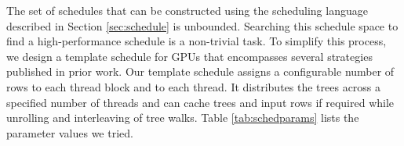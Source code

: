 The set of schedules that can be constructed using the scheduling language described in 
Section \ref{sec:schedule} is unbounded. Searching this schedule space to find a 
high-performance schedule is a non-trivial task. To simplify this process, we design a
template schedule for GPUs that encompasses several strategies published in prior work.
Our template schedule assigns a configurable number of rows to each thread block and to each thread.
It distributes the trees across a specified number of threads and can cache trees and 
input rows if required while unrolling and interleaving of tree walks.
Table \ref{tab:schedparams} lists the parameter values we tried. 

\begin{table}[htb]
  \centering
  \vskip 5pt
  \caption{\label{tab:schedparams} List of parameter values we explored for the template GPU schedule.}
\end{table}

